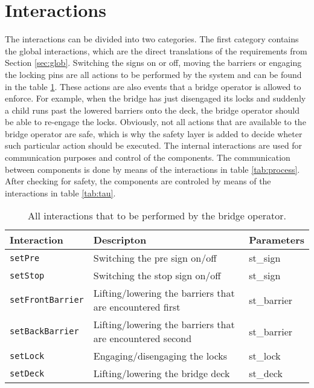 \section{Interactions}
\label{sec:act}


The interactions can be divided into two categories. The first category contains the global interactions, which are the direct translations of the requirements from Section \ref{sec:glob}.
Switching the signs on or off, moving the barriers or engaging the locking pins are all actions to be performed by the system and can be found in the table \ref{tab:glob}. These actions are also events that a bridge operator is allowed to enforce. For example, when the bridge has just disengaged its locks and suddenly a child runs past the lowered barriers onto the deck, the bridge operator should be able to re-engage the locks. Obviously, not all actions that are available to the bridge operator are safe, which is why the safety layer is added to decide wheter such particular action should be executed.
The internal interactions are used for communication purposes and control of the components. The communication between components is done by means of the interactions in table \ref{tab:process}. After checking for safety, the components are controled by means of the interactions in table \ref{tab:tau}.
%
\begin{table}[htb]%
\begin{tabular}{lll}
			\textbf{Interaction} &	\textbf{Descripton}	&	\textbf{Parameters}\\
  		\hline
  		\texttt{setPre} & Switching the pre sign on/off & st\_sign\\
      \texttt{setStop} & Switching the stop sign on/off & st\_sign\\
      \texttt{setFrontBarrier} & Lifting/lowering the barriers that are encountered first & st\_barrier\\
			\texttt{setBackBarrier} & Lifting/lowering the barriers that are encountered second & st\_barrier\\
      \texttt{setLock} & Engaging/disengaging the locks & st\_lock\\
      \texttt{setDeck} & Lifting/lowering the bridge deck & st\_deck\\
\end{tabular}
\caption{All interactions that to be performed by the bridge operator.}
\label{tab:glob}
\end{table}
%
